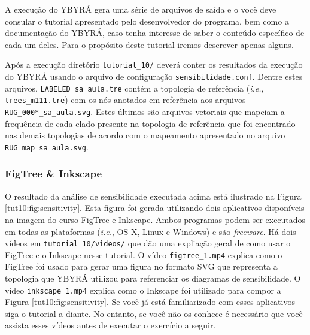\begin{refsection}
A execução do YBYRÁ gera uma série de arquivos de saída e o você deve consular o tutorial apresentado pelo desenvolvedor do programa, bem como a documentação do YBYRÁ, caso tenha interesse de saber o conteúdo específico de cada um deles. Para o propósito deste tutorial iremos descrever apenas alguns.

Após a execução diretório \texttt{tutorial\_10/} deverá conter os resultados da execução do YBYRÁ usando o arquivo de configuração \texttt{sensibilidade.conf}. Dentre estes arquivos, \texttt{LABELED\_sa\_aula.tre} contém a topologia de referência (\textit{i.e.}, \texttt{trees\_m111.tre}) com os nós anotados em referência aos arquivos \texttt{RUG\_000*\_sa\_aula.svg}. Estes últimos são arquivos vetoriais que mapeiam a frequência de cada clado presente na topologia de referência que foi encontrado nas demais topologias de acordo com o mapeamento apresentado no arquivo \texttt{RUG\_map\_sa\_aula.svg}. 

\subsubsection{FigTree \& Inkscape}\label{tut10:sa:evaluation:graphic}

O resultado da análise de sensibilidade executada acima está ilustrado na Figura \ref{tut10:fig:sensitivity}. Esta figura foi gerada utilizando dois aplicativos disponíveis na imagem do curso \href{http://tree.bio.ed.ac.uk/software/figtree/}{FigTree} e \href{http://www.inkscape.org/en/download/}{Inkscape}. Ambos programas podem ser executados em todas as plataformas (\textit{i.e.}, OS X, Linux e Windows) e são \textit{freeware}. Há dois vídeos em \texttt{tutorial\_10/videos/} que dão uma expliação geral de como usar o FigTree e o Inkscape nesse tutorial. O vídeo \texttt{figtree\_1.mp4} explica como o FigTree foi usado para gerar uma figura no formato SVG que representa a topologia que YBYRÁ utilizou para referenciar os diagramas de sensibilidade.  O vídeo \texttt{inkscape\_1.mp4} explica como o Inkscape foi utilizado para compor a Figura \ref{tut10:fig:sensitivity}. Se você já está familiarizado com esses aplicativos siga o tutorial a diante. No entanto, se você não os conhece é necessário que você assista esses vídeos antes de executar o exercício a seguir.


\end{refsection}
